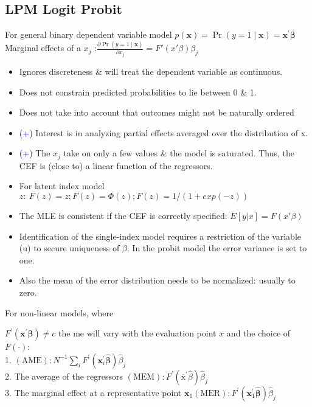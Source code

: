 \documentclass[
]{article}
\providecommand{\tightlist}{%
  \setlength{\itemsep}{0pt}\setlength{\parskip}{0pt}}
\begin{document}
\hypertarget{lpm-logit-probit}{%
\subsection{LPM Logit Probit}\label{lpm-logit-probit}}

For general binary dependent variable model
\(p(\mathbf{x})=\operatorname{Pr}(y=1 \mid \mathbf{x})=\mathbf{x}^{\prime} \boldsymbol{\beta}\)\\
Marginal effects of a \(x_{j}\)
:\(\frac{\partial \operatorname{Pr}(y=1 \mid \mathbf{x})}{\partial x_{j}} = F'(x'\beta)\beta_{j}\)

\begin{itemize}
\tightlist
\item
  Ignores discreteness \& will treat the dependent variable as
  continuous.
\item
  Does not constrain predicted probabilities to lie between 0 \& 1.
\item
  Does not take into account that outcomes might not be naturally
  ordered
\item
  \textcolor{blue}{(+)} Interest is in analyzing partial effects
  averaged over the distribution of x.
\item
  \textcolor{blue}{(+)} The \(x_j\) take on only a few values \& the
  model is saturated. Thus, the CEF is (close to) a linear function of
  the regressors.
\item
  For latent index model
  \(z: \ F(z) = z; F(z) = \Phi (z); F(z) = 1/(1+exp(-z))\)
\item
  The MLE is consistent if the CEF is correctly specified:
  \(E[y|x] = F(x'\beta)\)
\item
  Identification of the single-index model requires a restriction of the
  variable (u) to secure uniqueness of \(\beta\). In the probit model
  the error variance is set to one.
\item
  Also the mean of the error distribution needs to be normalized:
  usually to zero.
\end{itemize}

For non-linear models, where

\(F^{\prime}\left(\mathbf{x}^{\prime} \boldsymbol{\beta}\right) \neq c\)
the me will vary with the evaluation point \(x\) and the choice of
\(F(\cdot)\):\\
1.
\((\mathrm{AME}): N^{-1} \sum_{i} F^{\prime}\left(\mathbf{x}_{i}^{\prime} \widehat{\boldsymbol{\beta}}\right) \widehat{\beta}_{j}\)\\
2. The average of the regressors
\((\mathrm{MEM}): F^{\prime}\left(\overline{\mathrm{x}}^{\prime} \widehat{\beta}\right) \widehat{\beta}_{j}\)\\
3. The marginal effect at a representative point
\(\mathbf{x}_{1}(\mathrm{MER}): F^{\prime}\left(\mathbf{x}_{1}^{\prime} \widehat{\boldsymbol{\beta}}\right) \widehat{\beta}_{j}\)
\end{document}
